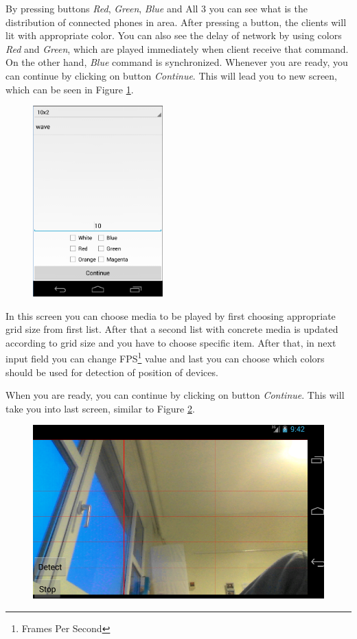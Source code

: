 By pressing buttons \emph{Red}, \emph{Green}, \emph{Blue} and All 3 you can see what is the distribution of connected phones in area. 
After pressing a button, the clients will lit with appropriate color.
You can also see the delay of network by using colors \emph{Red} and \emph{Green}, which are played immediately when client receive  that command.
On the other hand, \emph{Blue} command is synchronized.
Whenever you are ready, you can continue by clicking on button \emph{Continue}.
This will lead you to new screen, which can be seen in Figure \ref{fig:manual_server2}.

\begin{figure}[h]
	\centering
		\includegraphics[width=5cm]{appendix/server4.png}
	\caption{}
	\label{fig:manual_server2}
\end{figure}

In this screen you can choose media to be played by first choosing appropriate grid size from first list.
After that a second list with concrete media is updated according to grid size and you have to choose specific item.
After that, in next input field you can change FPS\footnote{Frames Per Second} value and last you can choose which colors should be used for detection of position of devices.

When you are ready, you can continue by clicking on button \emph{Continue}.
This will take you into last screen, similar to Figure \ref{fig:manual_server3}.
\begin{figure}[h]
	\centering
		\includegraphics[width=12cm]{appendix/server9.png}
	\caption{}
	\label{fig:manual_server3}
\end{figure}

